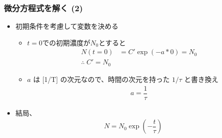 \documentclass[unicode,12pt,aspectratio=169]{beamer}
\begin{document}
\begin{frame}
	\frametitle{微分方程式を解く (2)}
			\begin{itemize}
				\item 初期条件を考慮して変数を決める
				\begin{itemize}
					\item $t=0$での初期濃度が$N_0$とすると
					\vspace{-3mm}
					\begin{align*}
						N(t=0) &= C' \exp(-a*0) = N_0 \\
						\therefore\; C' = N_0
					\end{align*}

					\item $a$ は [1/T] の次元なので、時間の次元を持った $1/\tau$ と書き換え
					\vspace{-3mm}
					\begin{align*}
						a = \dfrac{1}{\tau}
					\end{align*}
				\end{itemize}
				\item 結局、
				\begin{align*}
					N= N_0 \exp \left(-\dfrac{t}{\tau} \right)
				\end{align*}
			\end{itemize}
\end{frame}
\end{document}
